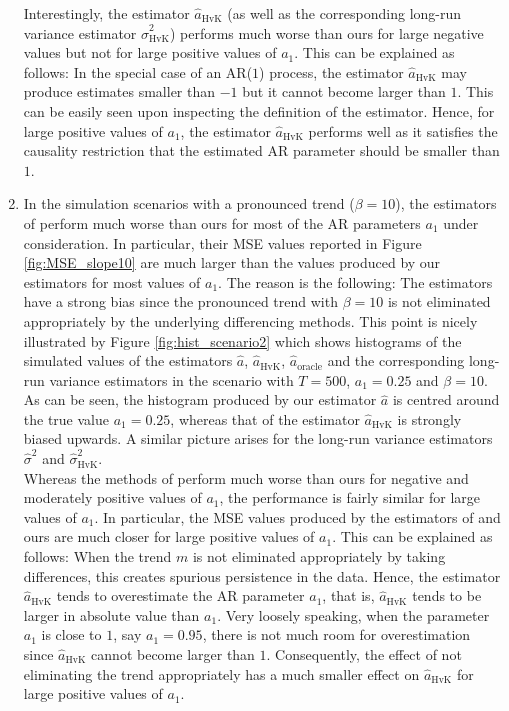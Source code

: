 \begin{enumerate}[label=(\roman*),leftmargin=0.9cm]
Interestingly, the estimator $\widehat{a}_{\text{HvK}}$ (as well as the corresponding long-run variance estimator $\widehat{\sigma}^2_{\text{HvK}}$) performs much worse than ours for large negative values but not for large positive values of $a_1$. This can be explained as follows: In the special case of an AR($1$) process, the estimator $\widehat{a}_{\text{HvK}}$ may produce estimates smaller than $-1$ but it cannot become larger than $1$. This can be easily seen upon inspecting the definition of the estimator. Hence, for large positive values of $a_1$, the estimator $\widehat{a}_{\text{HvK}}$ performs well as it satisfies the causality restriction that the estimated AR parameter should be smaller than $1$. 

\item In the simulation scenarios with a pronounced trend ($\beta = 10$), the estimators of \cite{Hall2003} perform much worse than ours for most of the AR parameters $a_1$ under consideration. In particular, their MSE values reported in Figure \ref{fig:MSE_slope10} are much larger than the values produced by our estimators for most values of $a_1$. The reason is the following: The estimators have a strong bias since the pronounced trend with $\beta = 10$ is not eliminated appropriately by the underlying differencing methods. This point is nicely illustrated by Figure \ref{fig:hist_scenario2} which shows histograms of the simulated values of the estimators $\widehat{a}$, $\widehat{a}_{\text{HvK}}$, $\widehat{a}_{\text{oracle}}$ and the corresponding long-run variance estimators in the scenario with $T=500$, $a_1=0.25$ and $\beta = 10$. As can be seen, the histogram produced by our estimator $\widehat{a}$ is centred around the true value $a_1 = 0.25$, whereas that of the estimator $\widehat{a}_{\text{HvK}}$ is strongly biased upwards. A similar picture arises for the long-run variance estimators $\widehat{\sigma}^2$ and $\widehat{\sigma}^2_{\text{HvK}}$. \\
Whereas the methods of \cite{Hall2003} perform much worse than ours for negative and moderately positive values of $a_1$, the performance is fairly similar for large values of $a_1$. In particular, the MSE values produced by the estimators of \cite{Hall2003} and ours are much closer for large positive values of $a_1$. This can be explained as follows: When the trend $m$ is not eliminated appropriately by taking differences, this creates spurious persistence in the data. Hence, the estimator $\widehat{a}_{\text{HvK}}$ tends to overestimate the AR parameter $a_1$, that is, $\widehat{a}_{\text{HvK}}$ tends to be larger in absolute value than $a_1$. Very loosely speaking, when the parameter $a_1$ is close to $1$, say $a_1 = 0.95$, there is not much room for overestimation since $\widehat{a}_{\text{HvK}}$ cannot become larger than $1$. Consequently, the effect of not eliminating the trend appropriately has a much smaller effect on $\widehat{a}_{\text{HvK}}$ for large positive values of $a_1$. 


\end{enumerate}
